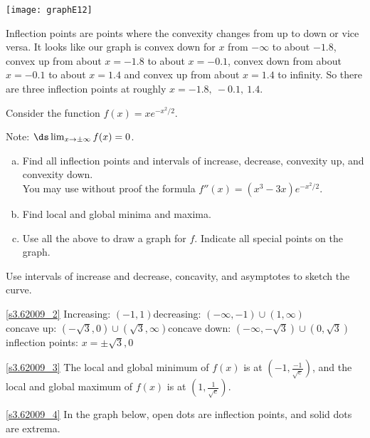 \begin{solution}
\begin{itemize}
\begin{center}\texttt{[image: graphE12]}\end{center}

Inflection points are points where the convexity changes from up
to down or vice versa. It looks like our graph is convex down for $x$ from
$-\infty$ to about $-1.8$, convex up from about $x=-1.8$ to about $x=-0.1$,
convex down from about $x=-0.1$ to about $x=1.4$ and convex up from about
$x=1.4$ to infinity. So there are three inflection points at roughly
$x=-1.8,\ -0.1,\ 1.4$.
\end{itemize}
\end{solution}


\begin{Mquestion}[2009H]\label{s3.6.6explast}
Consider the function $f(x) = xe^{-x^2/2}$.

Note: $\ds\lim_{x \to \pm\infty}f(x)=0$.
\begin{enumerate}[(a)]
\item\label{s3.62009_2} Find all inflection points and intervals of increase, decrease,
 convexity up, and convexity down. \\You may use without proof the formula
$f''(x) = (x^3-3x)e^{-x^2/2}$.
\item\label{s3.62009_3} Find local and global minima and maxima.
\item\label{s3.62009_4}  Use all the above to draw a graph for $f$. Indicate all
special points on the graph.
\end{enumerate}
\end{Mquestion}
\begin{hint}
Use intervals of increase and decrease, concavity, and asymptotes to sketch the curve.
\end{hint}
\begin{answer}
\eqref{s3.62009_2}
Increasing: $(-1,1)$\qquad decreasing: $(-\infty,-1)\cup (1,\infty)$\\
concave up: $(-\sqrt{3},0) \cup (\sqrt{3},\infty)$\qquad concave down: $(-\infty,-\sqrt{3}) \cup (0 ,\sqrt{3})$\\
inflection points: $x=\pm\sqrt{3}, 0$

\eqref{s3.62009_3}
The local and global minimum of $f(x)$ is at $(-1,\frac{-1}{\sqrt{e}})$, and the local and global maximum of $f(x)$ is at $(1,\frac{1}{\sqrt{e}})$.

\eqref{s3.62009_4}
In the graph below, open dots are inflection points, and
solid dots are extrema.
\begin{center}\end{center}
\end{answer}
